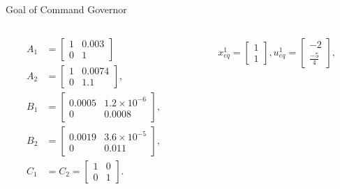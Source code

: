 \begin{slide}{Goal of Command Governor}
  \begin{columns}[c]
    \begin{column}{0.38\textwidth}
      \begin{equation}
        \begin{aligned}
          A_1 & =
          \begin{bmatrix}
            1 & 0.003 \\
            0 & 1
          \end{bmatrix}          \\
          A_2 & = \begin{bmatrix}
            1 & 0.0074 \\
            0 & 1.1
          \end{bmatrix}, \\
          B_1 & =
          \begin{bmatrix}
            0.0005 & 1.2\times{}10^{-6} \\
            0      & 0.0008
          \end{bmatrix},         \\
          B_2 & = \begin{bmatrix}
            0.0019 & 3.6\times{}10^{-5} \\
            0      & 0.011
          \end{bmatrix}, \\
          C_1 & = C_2 =
          \begin{bmatrix}
            1 & 0 \\
            0 & 1
          \end{bmatrix}.         \\
        \end{aligned}
      \end{equation}
    \end{column}%
    \hfill%
    \begin{column}{0.58\textwidth}
      \begin{equation}
        \begin{aligned}
          x_{eq}^1 = \begin{bmatrix}
            1 \\ 1
          \end{bmatrix},
          u_{eq}^1 = \begin{bmatrix}
            -2 \\ \frac{-5}{4}
          \end{bmatrix},

\end{aligned}
\end{equation}
\end{column}
\end{columns}
\end{slide}
